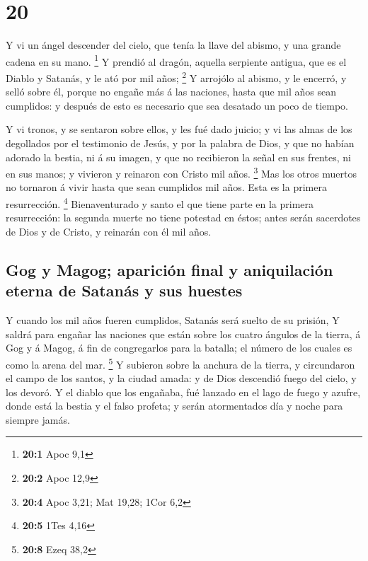 \hypertarget{section-19}{%
\section{20}\label{section-19}}

 Y vi un ángel descender del cielo, que tenía la llave del
abismo, y una grande cadena en su mano. \footnote{\textbf{20:1} Apoc 9,1}
 Y prendió al dragón, aquella serpiente antigua, que es el
Diablo y Satanás, y le ató por mil años; \footnote{\textbf{20:2} Apoc
  12,9}  Y arrojólo al abismo, y le encerró, y selló sobre
él, porque no engañe más á las naciones, hasta que mil años sean
cumplidos: y después de esto es necesario que sea desatado un poco de
tiempo.

 Y vi tronos, y se sentaron sobre ellos, y les fué dado
juicio; y vi las almas de los degollados por el testimonio de Jesús, y
por la palabra de Dios, y que no habían adorado la bestia, ni á su
imagen, y que no recibieron la señal en sus frentes, ni en sus manos; y
vivieron y reinaron con Cristo mil años. \footnote{\textbf{20:4} Apoc
  3,21; Mat 19,28; 1Cor 6,2}  Mas los otros muertos no
tornaron á vivir hasta que sean cumplidos mil años. Esta es la primera
resurrección. \footnote{\textbf{20:5} 1Tes 4,16} 
Bienaventurado y santo el que tiene parte en la primera resurrección: la
segunda muerte no tiene potestad en éstos; antes serán sacerdotes de
Dios y de Cristo, y reinarán con él mil años.

\hypertarget{gog-y-magog-apariciuxf3n-final-y-aniquilaciuxf3n-eterna-de-satanuxe1s-y-sus-huestes}{%
\subsection{Gog y Magog; aparición final y aniquilación eterna de
Satanás y sus
huestes}\label{gog-y-magog-apariciuxf3n-final-y-aniquilaciuxf3n-eterna-de-satanuxe1s-y-sus-huestes}}

 Y cuando los mil años fueren cumplidos, Satanás será
suelto de su prisión,  Y saldrá para engañar las naciones
que están sobre los cuatro ángulos de la tierra, á Gog y á Magog, á fin
de congregarlos para la batalla; el número de los cuales es como la
arena del mar. \footnote{\textbf{20:8} Ezeq 38,2}  Y
subieron sobre la anchura de la tierra, y circundaron el campo de los
santos, y la ciudad amada: y de Dios descendió fuego del cielo, y los
devoró.  Y el diablo que los engañaba, fué lanzado en el
lago de fuego y azufre, donde está la bestia y el falso profeta; y serán
atormentados día y noche para siempre jamás.

